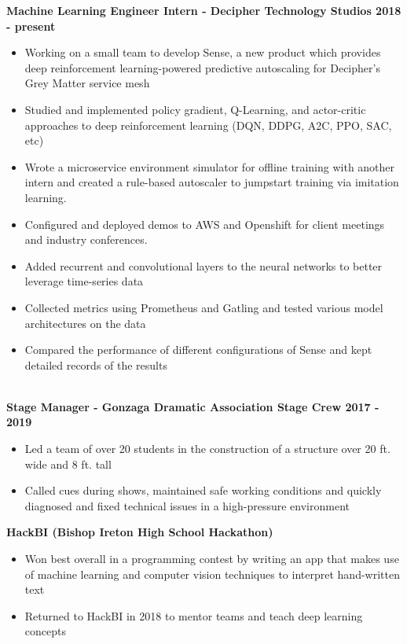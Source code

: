 \documentclass{article}
\begin{document}
\begin{center}
\begin{flushleft}
    \textbf{Machine Learning Engineer Intern - Decipher Technology Studios \hfill 2018 - present}
    \begin{itemize}
      \item Working on a small team to develop Sense, a new product which provides deep reinforcement learning-powered predictive autoscaling for Decipher’s Grey Matter service mesh
      \item Studied and implemented policy gradient, Q-Learning, and actor-critic approaches to deep reinforcement learning (DQN, DDPG, A2C, PPO, SAC, etc)
      \item Wrote a microservice environment simulator for offline training with another intern and created a rule-based autoscaler to jumpstart training via imitation learning.
      \item Configured and deployed demos to AWS and Openshift for client meetings and industry conferences.
      \item Added recurrent and convolutional layers to the neural networks to better leverage time-series data
      \item Collected metrics using Prometheus and Gatling and tested various model architectures on the data
      \item Compared the performance of different configurations of Sense and kept detailed records of the results
    \end{itemize}


    {\large\textbf{\underline{}}} \\
    \textbf{Stage Manager - Gonzaga Dramatic Association Stage Crew \hfill 2017 - 2019}
    \begin{itemize}
      \item Led a team of over 20 students in the construction of a structure over 20 ft. wide and 8 ft. tall
      \item Called cues during shows, maintained safe working conditions and quickly diagnosed and fixed technical issues in a high-pressure environment
    \end{itemize}

    \textbf{HackBI  (Bishop Ireton High School Hackathon)}

    \begin{itemize}
      \item Won best overall in a programming contest by writing an app that makes use of machine learning and computer vision techniques to interpret hand-written text
      \item Returned to HackBI in 2018 to mentor teams and teach deep learning concepts
    \end{itemize}


\end{flushleft}
\end{center}
\end{document}
